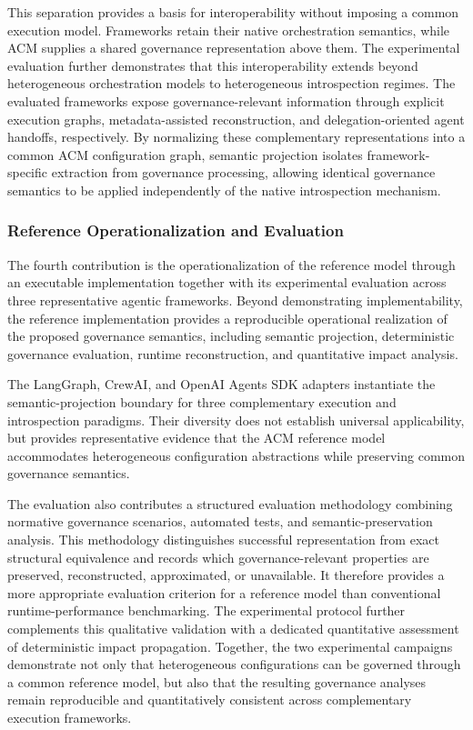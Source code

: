 \documentclass[10pt]{article}
\begin{document}
This separation provides a basis for interoperability without imposing a common execution model. Frameworks retain their native orchestration semantics, while ACM supplies a shared governance representation above them.
The experimental evaluation further demonstrates that this interoperability extends beyond heterogeneous orchestration models to heterogeneous introspection regimes. The evaluated frameworks expose governance-relevant information through explicit execution graphs, metadata-assisted reconstruction, and delegation-oriented agent handoffs, respectively. By normalizing these complementary representations into a common ACM configuration graph, semantic projection isolates framework-specific extraction from governance processing, allowing identical governance semantics to be applied independently of the native introspection mechanism.

\subsubsection{Reference Operationalization and Evaluation}

The fourth contribution is the operationalization of the reference model
through an executable implementation together with its experimental evaluation across three representative agentic frameworks.
Beyond demonstrating implementability, the reference implementation provides a reproducible operational realization of the proposed governance semantics, including semantic projection, deterministic governance evaluation, runtime reconstruction, and quantitative impact analysis.

The LangGraph, CrewAI, and OpenAI Agents SDK adapters instantiate the semantic-projection boundary for three complementary execution and introspection paradigms. Their diversity does not establish universal applicability, but provides representative evidence that the ACM reference model accommodates heterogeneous configuration abstractions while preserving common governance semantics. 

The evaluation also contributes a structured evaluation methodology combining normative governance scenarios, automated tests, and semantic-preservation analysis. This methodology distinguishes successful representation from exact structural equivalence and records which governance-relevant properties are preserved, reconstructed, approximated, or unavailable. It therefore provides a more appropriate evaluation criterion for a reference model than conventional runtime-performance benchmarking. The experimental protocol further complements this qualitative validation with a dedicated quantitative assessment of deterministic impact propagation. Together, the two experimental campaigns demonstrate not only that heterogeneous configurations can be governed through a common reference model, but also that the resulting governance analyses remain reproducible and quantitatively consistent across complementary execution frameworks.
\end{document}
